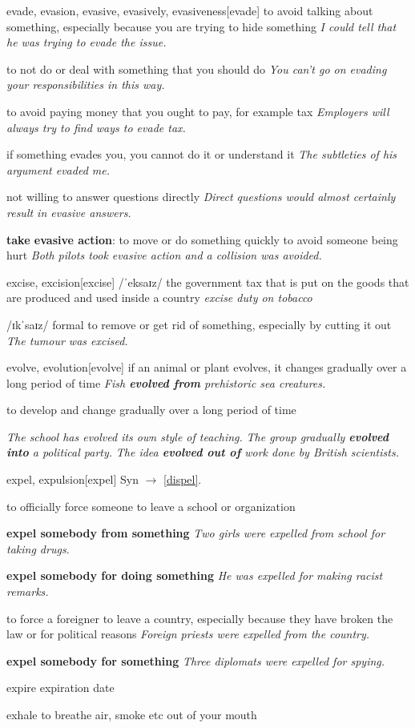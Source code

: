 \begin{word}{evade, evasion, evasive, evasively, evasiveness}[evade]
    to avoid talking about something, especially because you are trying to hide something
    \textit{I could tell that he was trying to evade the issue.}

    to not do or deal with something that you should do
    \textit{You can't go on evading your responsibilities in this way.}

    to avoid paying money that you ought to pay, for example tax
    \textit{Employers will always try to find ways to evade tax.}

    if something evades you, you cannot do it or understand it
    \textit{The subtleties of his argument evaded me.}

    not willing to answer questions directly
    \textit{Direct questions would almost certainly result in evasive answers.}

    \textbf{take evasive action}: to move or do something quickly to avoid someone being hurt
    \textit{Both pilots took evasive action and a collision was avoided.}
\end{word}

\begin{word}{excise, excision}[excise]
    /ˈeksaɪz/ the government tax that is put on the goods that are produced and used inside a country
    \textit{excise duty on tobacco}

    /ɪkˈsaɪz/ formal to remove or get rid of something, especially by cutting it out
    \textit{The tumour was excised.}
\end{word}

\begin{word}{evolve, evolution}[evolve]
    if an animal or plant evolves, it changes gradually over a long period of time
    \textit{Fish \textbf{evolved from} prehistoric sea creatures.}

    to develop and change gradually over a long period of time

    \textit{The school has evolved its own style of teaching.}
    \textit{The group gradually \textbf{evolved into} a political party.}
    \textit{The idea \textbf{evolved out of} work done by British scientists.}
\end{word}

\begin{word}{expel, expulsion}[expel]
    Syn $\rightarrow$ \ref{dispel}.

    to officially force someone to leave a school or organization
    
    \textbf{expel somebody from something}
    \textit{Two girls were expelled from school for taking drugs.}

    \textbf{expel somebody for doing something}
    \textit{He was expelled for making racist remarks.}

    to force a foreigner to leave a country, especially because they have broken the law or for political reasons
    \textit{Foreign priests were expelled from the country.}

    \textbf{expel somebody for something}
    \textit{Three diplomats were expelled for spying.}
\end{word}

\begin{word}{expire}
    expiration date
\end{word}

\begin{word}{exhale}
    to breathe air, smoke etc out of your mouth
\end{word}